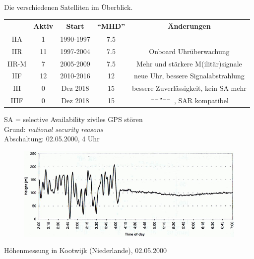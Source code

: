 \begin{frame}{Die verschiedenen Satelliten im Überblick.}
    \begin{table}
        \begin{tabular}{c S[table-format=2.0] c S[table-format=2.1] c}
            \toprule
            {} & {Aktiv} & {Start} & {\enquote{MHD}} & {Änderungen} \\
            \midrule
            IIA   &  1 & 1990-1997 & 7.5 & \\
            IIR   & 11 & 1997-2004 & 7.5 & Onboard Uhrüberwachung \\
            IIR-M &  7 & 2005-2009 & 7.5 & Mehr und stärkere M(ilitär)signale \\
            IIF   & 12 & 2010-2016 & 12  & neue Uhr, bessere Signalabstrahlung \\
            III   &  0 & Dez 2018  & 15  & bessere Zuverlässigkeit, kein SA mehr \\
            IIIF  &  0 & Dez 2018  & 15  & $^{\---}"^{\---}$ , SAR kompatibel \\
            \bottomrule
        \end{tabular}
    \end{table}
\end{frame}

\begin{frame}{SA = selective Availability}
    ziviles GPS stören\\
    Grund: \textit{national security reasons}\\
    Abschaltung: 02.05.2000, 4 Uhr
    \begin{figure}
        \centering
        \includegraphics[width=\textwidth]{images/sa-hoehe.PDF}
    \end{figure}
    Höhenmessung in Kootwijk (Niederlande), 02.05.2000\;
\end{frame}

